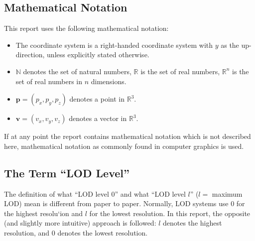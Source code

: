 \subsection{Mathematical Notation}
This report uses the following mathematical notation:
\begin{itemize}
      \item The coordinate system is a right-handed coordinate system with $y$ as the up-direction, unless explicitly stated otherwise.
      \item $\mathbb{N}$ denotes the set of natural numbers, $\mathbb{R}$ is the set of real numbers, $\mathbb{R}^n$ is the set of real numbers in $n$ dimensions.
      \item $\mathbf{p} = (p_x, p_y, p_z)$ denotes a point in $\mathbb{R}^3$.
      \item $\mathbf{v} = (v_x, v_y, v_z)$ denotes a vector in $\mathbb{R}^3$.
\end{itemize}
If at any point the report contains mathematical notation which is
not described here, 
mathematical notation as commonly found in computer graphics is used.

\subsection{The Term ``LOD Level''}
The definition of what ``LOD level 0'' and what ``LOD level $l$'' ($l = $ maximum LOD) mean is different from paper to paper.
Normally, LOD systems use 0 for the highest resolu`ion and $l$ for the lowest resolution.
In this report, the opposite (and slightly more intuitive) approach is followed: $l$ denotes the highest resolution, and 0 denotes the lowest resolution.

